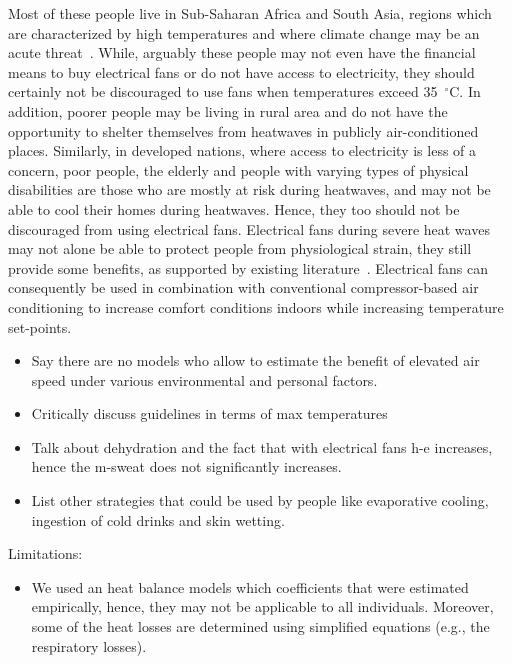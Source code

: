 Most of these people live in Sub-Saharan Africa and South Asia, regions which are characterized by high temperatures and where climate change may be an acute threat~\cite{PovertyO1:online}.
While, arguably these people may not even have the financial means to buy electrical fans or do not have access to electricity, they should certainly not be discouraged to use fans when temperatures exceed 35~$^{\circ}$C\@.
In addition, poorer people may be living in rural area and do not have the opportunity to shelter themselves from heatwaves in publicly air-conditioned places.
Similarly, in developed nations, where access to electricity is less of a concern, poor people, the elderly and people with varying types of physical disabilities are those who are mostly at risk during heatwaves, and may not be able to cool their homes during heatwaves.
Hence, they too should not be discouraged from using electrical fans.
Electrical fans during severe heat waves may not alone be able to protect people from physiological strain, they still provide some benefits, as supported by existing literature~\cite{Jay2015, Jay2019a}.
Electrical fans can consequently be used in combination with conventional compressor-based air conditioning to increase comfort conditions indoors while increasing temperature set-points.

\begin{itemize}
    \item Say there are no models who allow to estimate the benefit of elevated air speed under various environmental and personal factors.
    \item Critically discuss guidelines in terms of max temperatures
    \item Talk about dehydration and the fact that with electrical fans \ac{h-e} increases, hence the \ac{m-sweat} does not significantly increases. %
    \item List other strategies that could be used by people like evaporative cooling, ingestion of cold drinks and skin wetting.
\end{itemize}

Limitations:
\begin{itemize}
    \item We used an heat balance models which coefficients that were estimated empirically, hence, they may not be applicable to all individuals.
    Moreover, some of the heat losses are determined using simplified equations (e.g., the respiratory losses).
\end{itemize}
